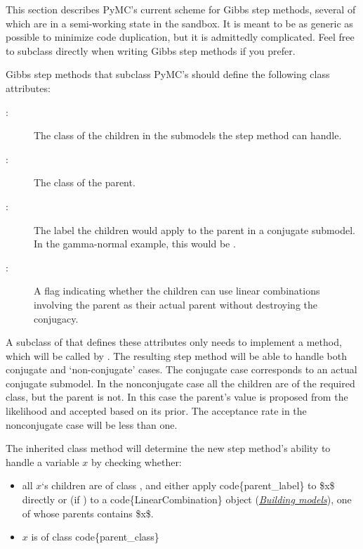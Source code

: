 \documentclass[letterpaper,10pt,english]{sphinxmanual}
\begin{document}
This section describes PyMC's current scheme for Gibbs step methods, several of which are in a semi-working state in the sandbox. It is meant to be as generic as possible to minimize code duplication, but it is admittedly complicated. Feel free to subclass  directly when writing Gibbs step methods if you prefer.

Gibbs step methods that subclass PyMC's  should define the following class attributes:
\begin{description}
\item[{:}] \leavevmode
The class of the children in the submodels the step method can handle.

\item[{:}] \leavevmode
The class of the parent.

\item[{:}] \leavevmode
The label the children would apply to the parent in a conjugate submodel.
In the gamma-normal example, this would be .

\item[{:}] \leavevmode
A flag indicating whether the children can use linear combinations
involving the parent as their actual parent without destroying the
conjugacy.

\end{description}

A subclass of  that defines these attributes only needs to implement a  method, which will be called by . The resulting step method will be able to handle both conjugate and `non-conjugate' cases. The conjugate case corresponds to an actual conjugate submodel. In the nonconjugate case all the children are of the required class, but the parent is not. In this case the parent's value is proposed from the likelihood and accepted based on its prior. The acceptance rate in the nonconjugate case will be less than one.

The inherited class method  will determine the new step method's ability to handle a variable $x$ by checking whether:
\begin{itemize}
\item {} 
all $x$`s children are of class , and either apply code\{parent\_label\} to \$x\$ directly or (if ) to a code\{LinearCombination\} object ({\hyperref[modelbuilding:chap-modelbuilding]{\emph{Building models}}}), one of whose parents contains \$x\$.

\item {} 
$x$ is of class code\{parent\_class\}

\end{itemize}
\end{document}
